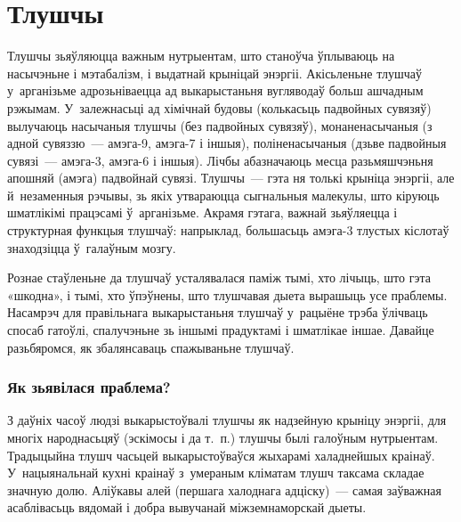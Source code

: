 \chapter{Тлушчы}

Тлушчы зьяўляюцца важным нутрыентам, што станоўча ўплываюць на насычэньне і мэтабалізм, і выдатнай крыніцай энэргіі. Акісьленьне тлушчаў у~арганізьме адрозьніваецца ад выкарыстаньня вугляводаў больш ашчадным рэжымам. У~залежнасьці ад хімічнай будовы (колькасьць падвойных сувязяў) вылучаюць насычаныя тлушчы (без падвойных сувязяў), монаненасычаныя (з адной сувяззю~--- амэга-9, амэга-7 і іншыя), поліненасычаныя (дзьве падвойныя сувязі~--- амэга-3, амэга-6 і іншыя). Лічбы абазначаюць месца разьмяшчэньня апошняй (амэга) падвойнай сувязі. Тлушчы~--- гэта ня толькі крыніца энэргіі, але й~незаменныя рэчывы, зь якіх утвараюцца сыгнальныя малекулы, што кіруюць шматлікімі працэсамі ў~арганізьме. Акрамя гэтага, важнай зьяўляецца і структурная функцыя тлушчаў: напрыклад, большасьць амэга-3 тлустых кіслотаў знаходзіцца ў~галаўным мозгу.

Рознае стаўленьне да тлушчаў усталявалася паміж тымі, хто лічыць, што гэта «шкодна», і тымі, хто ўпэўнены, што тлушчавая дыета вырашыць усе праблемы. Насамрэч для правільнага выкарыстаньня тлушчаў у~рацыёне трэба ўлічваць спосаб гатоўлі, спалучэньне зь іншымі прадуктамі і шматлікае іншае. Давайце разьбяромся, як збалянсаваць спажываньне тлушчаў.


\subsection{Як зьявілася праблема?}

З даўніх часоў людзі выкарыстоўвалі тлушчы як надзейную крыніцу энэргіі, для многіх народнасьцяў (эскімосы і да т.~п.) тлушчы былі галоўным нутрыентам. Традыцыйна тлушч часьцей выкарыстоўваўся жыхарамі халаднейшых краінаў. У~нацыянальнай кухні краінаў з~умераным кліматам тлушч таксама складае значную долю. Аліўкавы алей (першага халоднага адціску)~--- самая заўважная асаблівасьць вядомай і добра вывучанай міжземнаморскай дыеты.


